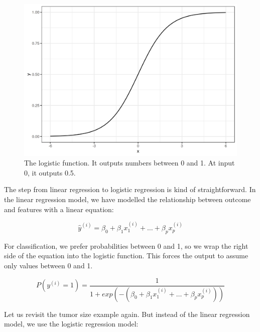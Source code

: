 \documentclass[12pt,]{krantz}
\begin{document}
\begin{figure}

{\centering \includegraphics[width=\textwidth]{images/logistic-function-1} 

}

\caption{The logistic function. It outputs numbers between 0 and 1. At input 0, it outputs 0.5.}\label{fig:logistic-function}
\end{figure}

The step from linear regression to logistic regression is kind of
straightforward. In the linear regression model, we have modelled the
relationship between outcome and features with a linear equation:

\[\hat{y}^{(i)}=\beta_{0}+\beta_{1}x^{(i)}_{1}+\ldots+\beta_{p}x^{(i)}_{p}\]

For classification, we prefer probabilities between 0 and 1, so we wrap
the right side of the equation into the logistic function. This forces
the output to assume only values between 0 and 1.

\[P(y^{(i)}=1)=\frac{1}{1+exp(-(\beta_{0}+\beta_{1}x^{(i)}_{1}+\ldots+\beta_{p}x^{(i)}_{p}))}\]

Let us revisit the tumor size example again. But instead of the linear
regression model, we use the logistic regression model:
\end{document}
